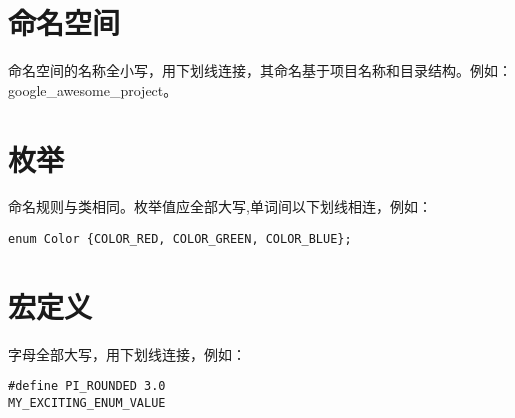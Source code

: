 \section{命名空间}
命名空间的名称全小写，用下划线连接，其命名基于项目名称和目录结构。例如：google\_awesome\_project。


\section{枚举}
命名规则与类相同。枚举值应全部大写,单词间以下划线相连，例如：
\begin{verbatim}
enum Color {COLOR_RED, COLOR_GREEN, COLOR_BLUE};
\end{verbatim}


\section{宏定义}
字母全部大写，用下划线连接，例如：
\begin{verbatim}
#define PI_ROUNDED 3.0
MY_EXCITING_ENUM_VALUE
\end{verbatim}